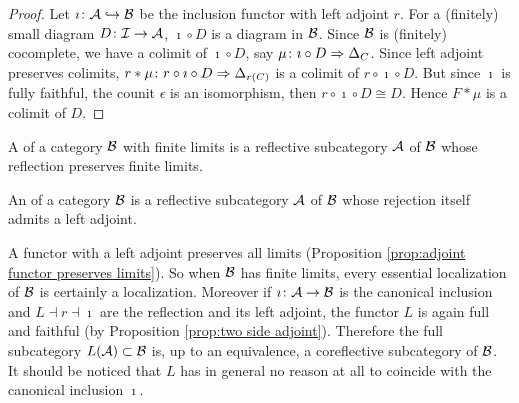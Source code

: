   \begin{proof}
    Let $\imath\colon{\cal A}\hookrightarrow{\cal B}$ be the inclusion functor with left adjoint $r$. For a (finitely) small diagram $D\colon{\cal I}\to{\cal A}$, $\imath\circ D$ is a diagram in ${\cal B}$. Since ${\cal B}$ is (finitely) cocomplete, we have a colimit of $\imath\circ D$, say $\mu\colon\imath\circ D\Rightarrow\Delta_C$. Since left adjoint preserves colimits, $r\ast\mu\colon r\circ\imath\circ D\Rightarrow\Delta_{r(C)}$ is a colimit of $r\circ\imath\circ D$. But since $\imath$ is fully faithful, the counit $\epsilon$ is an isomorphism, then $r\circ\imath\circ D\cong D$. Hence $F\ast\mu$ is a colimit of $D$.
  \end{proof}

  \begin{defn}
    A  of a category ${\cal B}$ with finite limits is a reflective subcategory ${\cal A}$ of ${\cal B}$ whose reflection preserves finite limits.
  \end{defn}
  \begin{defn}
    An  of a category ${\cal B}$ is a reflective subcategory ${\cal A}$ of ${\cal B}$ whose rejection itself admits a left adjoint.
  \end{defn}

  A functor with a left adjoint preserves all limits (Proposition \ref{prop:adjoint functor preserves limits}). So when ${\cal B}$ has finite limits, every essential localization of ${\cal B}$ is certainly a localization.
  Moreover if $\imath\colon{\cal A}\to{\cal B}$ is the canonical inclusion and $L\dashv r\dashv\imath$ are the reflection and its left adjoint, the functor $L$ is again full and faithful (by Proposition \ref{prop:two side adjoint}).
  Therefore the full subcategory $L({\cal A})\subset{\cal B}$ is, up to an equivalence, a coreflective subcategory of ${\cal B}$. It should be noticed that $L$ has in general no reason at all to coincide with the canonical inclusion $\imath$.

